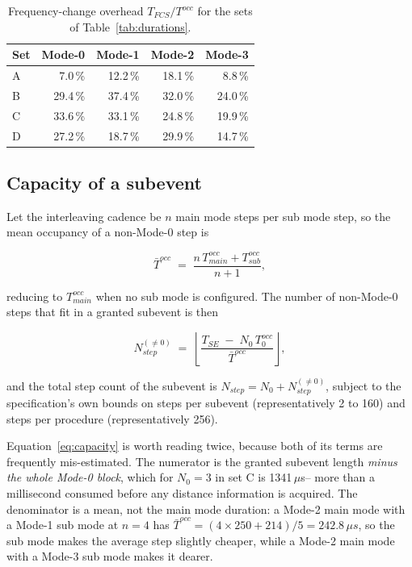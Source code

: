 \documentclass[11pt,a4paper]{article}
\newcommand{\us}{\,\ensuremath{\upmu}s}
\newcommand{\Tfcs}{T_{FCS}}
\newcommand{\Tse}{T_{SE}}
\newcommand{\Nst}{N_{step}}
\providecommand{\upmu}{\mu}
\begin{document}
\begin{table}[h]
\caption{Frequency-change overhead $\Tfcs / T^{occ}$ for the sets of Table~\ref{tab:durations}.}
\label{tab:overhead}
\centering\small
\begin{tabular}{@{}lrrrr@{}}
\toprule
Set & Mode-0 & Mode-1 & Mode-2 & Mode-3 \\
\midrule
A & 7.0\,\%  & 12.2\,\% & 18.1\,\% & 8.8\,\% \\
B & 29.4\,\% & 37.4\,\% & 32.0\,\% & 24.0\,\% \\
C & 33.6\,\% & 33.1\,\% & 24.8\,\% & 19.9\,\% \\
D & 27.2\,\% & 18.7\,\% & 29.9\,\% & 14.7\,\% \\
\bottomrule
\end{tabular}
\end{table}

\subsection{Capacity of a subevent}

Let the interleaving cadence be $n$ main mode steps per sub mode step, so the mean occupancy of a
non-Mode-0 step is

\begin{equation}
\bar{T}^{occ} \;=\; \frac{n\,T^{occ}_{main} + T^{occ}_{sub}}{n+1},
\label{eq:meanocc}
\end{equation}

reducing to $T^{occ}_{main}$ when no sub mode is configured. The number of non-Mode-0 steps that fit
in a granted subevent is then

\begin{equation}
\Nst^{(\ne 0)} \;=\; \left\lfloor
   \frac{\Tse \;-\; N_0\,T^{occ}_{0}}{\bar{T}^{occ}} \right\rfloor ,
\label{eq:capacity}
\end{equation}

and the total step count of the subevent is $\Nst = N_0 + \Nst^{(\ne 0)}$, subject to the
specification's own bounds on steps per subevent (representatively 2 to 160) and steps per procedure
(representatively 256).

Equation~\eqref{eq:capacity} is worth reading twice, because both of its terms are frequently
mis-estimated. The numerator is the granted subevent length \emph{minus the whole Mode-0 block},
which for $N_0 = 3$ in set C is 1341\us -- more than a millisecond consumed before any distance
information is acquired. The denominator is a mean, not the main mode duration: a Mode-2 main mode
with a Mode-1 sub mode at $n = 4$ has $\bar{T}^{occ} = (4 \times 250 + 214)/5 = 242.8\us$, so the
sub mode makes the average step slightly cheaper, while a Mode-2 main mode with a Mode-3 sub mode
makes it dearer.
\end{document}
